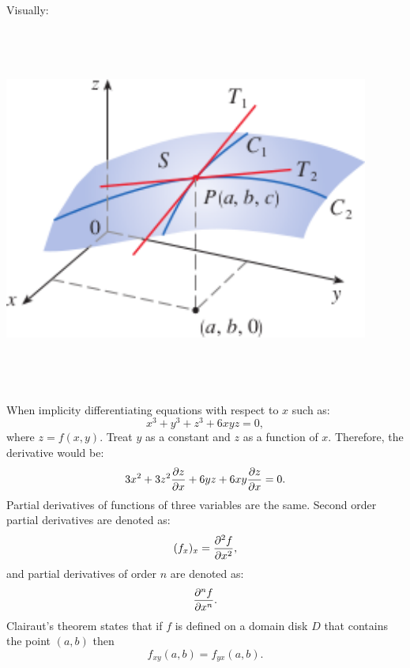 \documentclass{article}
\begin{document}
\noindent Visually: 
\begin{center}
    \includegraphics[width=12cm,height=12cm, keepaspectratio]{Images/PartialDerivative.png}
\end{center}

When implicity differentiating equations with respect to $x$ such as:
\[x^3 + y^3 + z^3 + 6xyz = 0,\] where $z = f(x,y)$. Treat $y$ as a constant and $z$
as a function of $x$. Therefore, the derivative would be:
\[3x^2 + 3z^2\pdv{z}{x} + 6yz + 6xy\pdv{z}{x} = 0.\]
Partial derivatives of functions of three variables are the same. Second order
partial derivatives are denoted as:
\[(f_x)_x = \pdv[2]{f}{x},\]
and partial derivatives of order $n$ are denoted as:
\[\pdv[n]{f}{x}.\]
Clairaut's theorem states that if $f$ is defined on a domain disk $D$ that contains
the point $(a,b)$ then
\[f_{xy}(a,b) = f_{yx}(a,b).\]
\end{document}
